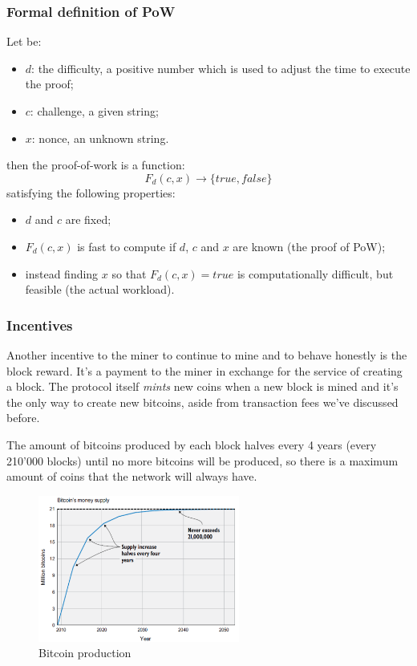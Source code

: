 \subsubsection{Formal definition of PoW}
Let be:
\begin{itemize}
    \item $d$: the difficulty, a positive number which is used to adjust the time to execute the proof;
    \item $c$: challenge, a given string;
    \item $x$: nonce, an unknown string.
\end{itemize}
then the proof-of-work is a function:
$$
    F_d(c,x) \xrightarrow{} \{true, false\}
$$
satisfying the following properties:
\begin{itemize}
    \item $d$ and $c$ are fixed;
    \item $F_d(c,x)$ is fast to compute if $d$, $c$ and $x$ are known (the proof of PoW);
    \item instead finding $x$ so that $F_d(c,x) = true$ is computationally difficult, but feasible (the actual workload).
\end{itemize}

\subsubsection{Incentives}
Another incentive to the miner to continue to mine and to behave honestly is the block reward.
It's a payment to the miner in exchange for the service of creating a block.
The protocol itself \emph{mints} new coins when a new block is mined and it's the only way to create new bitcoins, aside from transaction fees we've discussed before.

The amount of bitcoins produced by each block halves every 4 years (every 210'000 blocks) until no more bitcoins will be produced, so there is a maximum amount of coins that the network will always have.

\begin{figure}[H]
    \centering
    \includegraphics[width=250px]{images/6_Bitcoin/04.png}
    \caption{Bitcoin production}
\end{figure}


